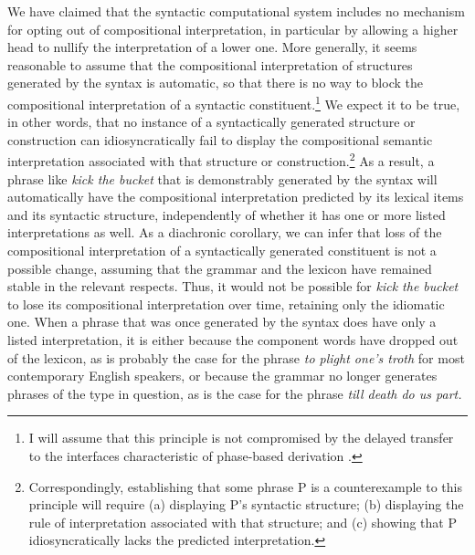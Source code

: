 \documentclass[output=paper,
modfonts
]{LSP/langsci}
\begin{document}
We have claimed that the syntactic computational system includes no
mechanism for opting out of compositional interpretation, in particular
by allowing a higher head to nullify the interpretation of a lower one.
More generally, it seems reasonable to assume that the compositional
interpretation of structures generated by the syntax is automatic, so
that there is no way to block the compositional interpretation of a
syntactic constituent.\footnote{I will assume that this principle is not
  compromised by the delayed transfer to the interfaces characteristic
  of phase-based derivation \citep{chomsky2001b}.} We expect it to be true, in
other words, that no instance of a syntactically generated structure or
construction can idiosyncratically fail to display the compositional
semantic interpretation associated with that structure or
construction.\footnote{Correspondingly, establishing that some phrase P
  is a counterexample to this principle will require (a) displaying P's
  syntactic structure; (b) displaying the rule of interpretation
  associated with that structure; and (c) showing that P
  idiosyncratically lacks the predicted interpretation.} As a result, a
phrase like \textit{kick the bucket} that is demonstrably generated by the
syntax will automatically have the compositional interpretation
predicted by its lexical items and its syntactic structure,
independently of whether it has one or more listed interpretations as
well. As a diachronic corollary, we can infer that loss of the
compositional interpretation of a syntactically generated constituent is
not a possible change, assuming that the grammar and the lexicon have
remained stable in the relevant respects. Thus, it would not be possible
for \textit{kick the bucket} to lose its compositional interpretation over
time, retaining only the idiomatic one. When a phrase that was once
generated by the syntax does have only a listed interpretation, it is
either because the component words have dropped out of the lexicon, as
is probably the case for the phrase \textit{to plight one's troth} for
most contemporary English speakers, or because the grammar no longer
generates phrases of the type in question, as is the case for the phrase
\textit{till death do us part.}
\end{document}
